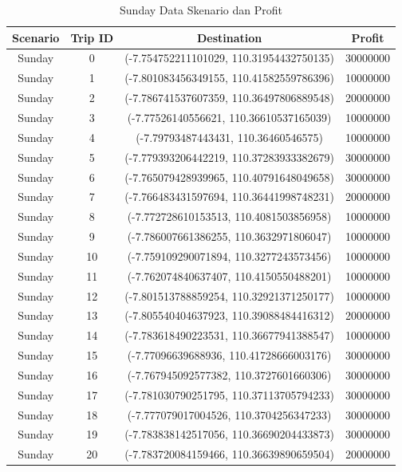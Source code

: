 \documentclass{skripsimathugm}
\begin{document}
\begin{table}[H]
\centering
\caption{Sunday Data Skenario dan Profit}
\label{Sunday Data Skenario dan Profit}
\begin{tabular}{|c|c|c|c|}
\hline
\textbf{Scenario} & \textbf{Trip ID} & \textbf{Destination} & \textbf{Profit} \\
\hline

Sunday & 0 & (-7.754752211101029, 110.31954432750135) & 30000000 \\
Sunday & 1 & (-7.801083456349155, 110.41582559786396) & 10000000 \\
Sunday & 2 & (-7.786741537607359, 110.36497806889548) & 20000000 \\
Sunday & 3 & (-7.77526140556621, 110.36610537165039) & 10000000 \\
Sunday & 4 & (-7.79793487443431, 110.36460546575) & 10000000 \\
Sunday & 5 & (-7.779393206442219, 110.37283933382679) & 30000000 \\
Sunday & 6 & (-7.765079428939965, 110.40791648049658) & 30000000 \\
Sunday & 7 & (-7.766483431597694, 110.36441998748231) & 20000000 \\
Sunday & 8 & (-7.772728610153513, 110.4081503856958) & 10000000 \\
Sunday & 9 & (-7.786007661386255, 110.3632971806047) & 10000000 \\
Sunday & 10 & (-7.759109290071894, 110.3277243573456) & 10000000 \\
Sunday & 11 & (-7.762074840637407, 110.4150550488201) & 10000000 \\
Sunday & 12 & (-7.801513788859254, 110.32921371250177) & 10000000 \\
Sunday & 13 & (-7.805540404637923, 110.39088484416312) & 20000000 \\
Sunday & 14 & (-7.783618490223531, 110.36677941388547) & 10000000 \\
Sunday & 15 & (-7.77096639688936, 110.41728666003176) & 30000000 \\
Sunday & 16 & (-7.767945092577382, 110.3727601660306) & 30000000 \\
Sunday & 17 & (-7.781030790251795, 110.37113705794233) & 30000000 \\
Sunday & 18 & (-7.777079017004526, 110.3704256347233) & 30000000 \\
Sunday & 19 & (-7.783838142517056, 110.36690204433873) & 30000000 \\
Sunday & 20 & (-7.783720084159466, 110.36639890659504) & 20000000 \\

\end{tabular}
\end{table}
\end{document}
